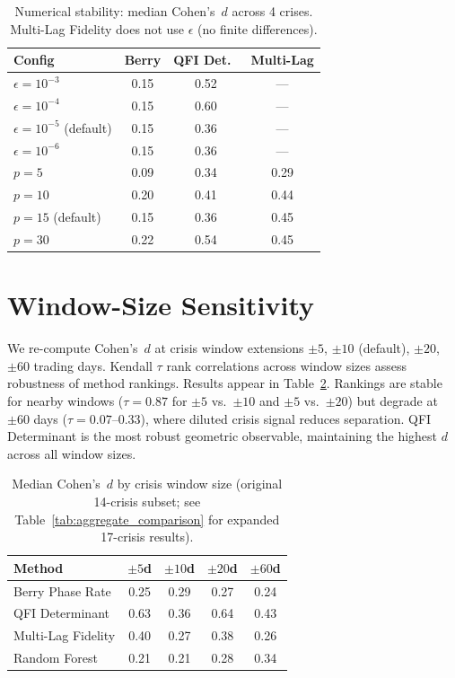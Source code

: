 \documentclass[3p]{elsarticle}
\begin{document}
\begin{table}[htb]
\centering
\caption{Numerical stability: median Cohen's~$d$ across 4 crises.
Multi-Lag Fidelity does not use $\epsilon$ (no finite differences).}
\label{tab:stability}
\small
\begin{tabular}{lccc}
\toprule
Config & Berry & QFI Det.\ & Multi-Lag \\
\midrule
$\epsilon = 10^{-3}$ & 0.15 & 0.52 & --- \\
$\epsilon = 10^{-4}$ & 0.15 & 0.60 & --- \\
$\epsilon = 10^{-5}$ (default) & 0.15 & 0.36 & --- \\
$\epsilon = 10^{-6}$ & 0.15 & 0.36 & --- \\
\midrule
$p = 5$  & 0.09 & 0.34 & 0.29 \\
$p = 10$ & 0.20 & 0.41 & 0.44 \\
$p = 15$ (default) & 0.15 & 0.36 & 0.45 \\
$p = 30$ & 0.22 & 0.54 & 0.45 \\
\bottomrule
\end{tabular}
\end{table}

\section{Window-Size Sensitivity}\label{sec:window_sensitivity}

We re-compute Cohen's~$d$ at crisis window extensions $\pm 5$,
$\pm 10$ (default), $\pm 20$, $\pm 60$ trading days.  Kendall $\tau$
rank correlations across window sizes assess robustness of method
rankings.  Results appear in Table~\ref{tab:window}.  Rankings are
stable for nearby windows ($\tau = 0.87$ for $\pm 5$ vs.\ $\pm 10$
and $\pm 5$ vs.\ $\pm 20$) but degrade at $\pm 60$ days
($\tau = 0.07$--$0.33$), where diluted crisis signal reduces
separation.  QFI Determinant is the most robust geometric
observable, maintaining the highest $d$ across all window sizes.

\begin{table}[htb]
\centering
\caption{Median Cohen's~$d$ by crisis window size (original 14-crisis subset; see Table~\ref{tab:aggregate_comparison} for expanded 17-crisis results).}
\label{tab:window}
\small
\begin{tabular}{lcccc}
\toprule
Method & $\pm 5$d & $\pm 10$d & $\pm 20$d & $\pm 60$d \\
\midrule
Berry Phase Rate  & 0.25 & 0.29 & 0.27 & 0.24 \\
QFI Determinant      & 0.63 & 0.36 & 0.64 & 0.43 \\
Multi-Lag Fidelity   & 0.40 & 0.27 & 0.38 & 0.26 \\
Random Forest        & 0.21 & 0.21 & 0.28 & 0.34 \\
\bottomrule
\end{tabular}
\end{table}
\end{document}
